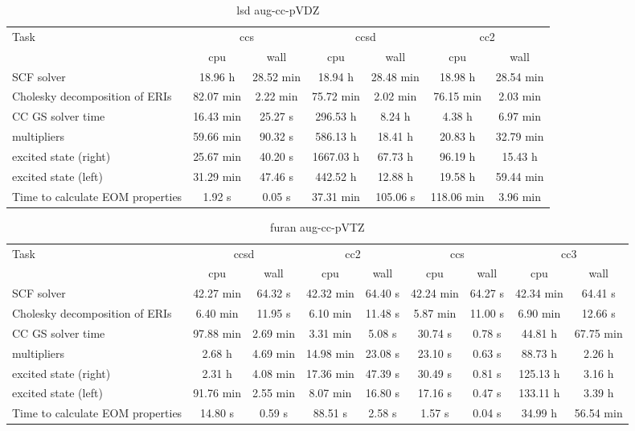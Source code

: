 \documentclass{article}
\begin{document}
\begin{table}
\caption{lsd aug-cc-pVDZ}
\begin{tabular}{lcccccc}
\toprule
Task & \multicolumn{2}{c}{ccs} & \multicolumn{2}{c}{ccsd} & \multicolumn{2}{c}{cc2}\\
\cmidrule(lr){2-3}\cmidrule(lr){4-5}\cmidrule(lr){6-7}
 & cpu & wall & cpu & wall & cpu & wall\\
\midrule
SCF solver & 18.96 h & 28.52 min & 18.94 h & 28.48 min & 18.98 h & 28.54 min\\
Cholesky decomposition of ERIs & 82.07 min & 2.22 min & 75.72 min & 2.02 min & 76.15 min & 2.03 min\\
CC GS solver time & 16.43 min & 25.27 s & 296.53 h & 8.24 h & 4.38 h & 6.97 min\\
multipliers & 59.66 min & 90.32 s & 586.13 h & 18.41 h & 20.83 h & 32.79 min\\
excited state (right) & 25.67 min & 40.20 s & 1667.03 h & 67.73 h & 96.19 h & 15.43 h\\
excited state (left) & 31.29 min & 47.46 s & 442.52 h & 12.88 h & 19.58 h & 59.44 min\\
Time to calculate EOM properties & 1.92 s & 0.05 s & 37.31 min & 105.06 s & 118.06 min & 3.96 min\\
\bottomrule
\end{tabular}
\end{table}
\begin{table}
\caption{furan aug-cc-pVTZ}
\begin{tabular}{lcccccccc}
\toprule
Task & \multicolumn{2}{c}{ccsd} & \multicolumn{2}{c}{cc2} & \multicolumn{2}{c}{ccs} & \multicolumn{2}{c}{cc3}\\
\cmidrule(lr){2-3}\cmidrule(lr){4-5}\cmidrule(lr){6-7}\cmidrule(lr){8-9}
 & cpu & wall & cpu & wall & cpu & wall & cpu & wall\\
\midrule
SCF solver & 42.27 min & 64.32 s & 42.32 min & 64.40 s & 42.24 min & 64.27 s & 42.34 min & 64.41 s\\
Cholesky decomposition of ERIs & 6.40 min & 11.95 s & 6.10 min & 11.48 s & 5.87 min & 11.00 s & 6.90 min & 12.66 s\\
CC GS solver time & 97.88 min & 2.69 min & 3.31 min & 5.08 s & 30.74 s & 0.78 s & 44.81 h & 67.75 min\\
multipliers & 2.68 h & 4.69 min & 14.98 min & 23.08 s & 23.10 s & 0.63 s & 88.73 h & 2.26 h\\
excited state (right) & 2.31 h & 4.08 min & 17.36 min & 47.39 s & 30.49 s & 0.81 s & 125.13 h & 3.16 h\\
excited state (left) & 91.76 min & 2.55 min & 8.07 min & 16.80 s & 17.16 s & 0.47 s & 133.11 h & 3.39 h\\
Time to calculate EOM properties & 14.80 s & 0.59 s & 88.51 s & 2.58 s & 1.57 s & 0.04 s & 34.99 h & 56.54 min\\
\bottomrule
\end{tabular}
\end{table}
\end{document}
